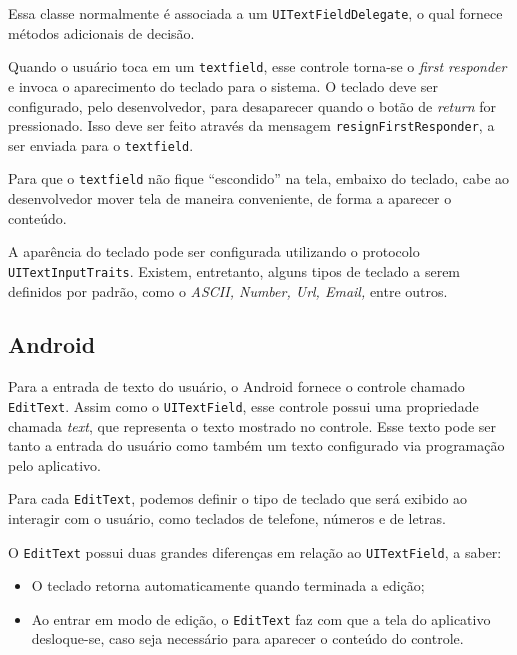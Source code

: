 	Essa classe normalmente é associada a um \texttt{UITextFieldDelegate}, o qual fornece métodos adicionais de decisão.
    
	Quando o usuário toca em um \texttt{textfield}, esse controle torna-se o \emph{first responder} e invoca o aparecimento do teclado para o sistema. O teclado deve ser configurado, pelo desenvolvedor, para desaparecer quando o botão de \emph{return} for pressionado. Isso deve ser feito através da mensagem \texttt{resignFirstResponder}, a ser enviada para o \texttt{textfield}.
    
	Para que o \texttt{textfield} não fique ``escondido'' na tela, embaixo do teclado, cabe ao desenvolvedor mover tela de maneira conveniente, de forma a aparecer o conteúdo.
   
    A aparência do teclado pode ser configurada utilizando o protocolo \texttt{UITextInputTraits}. Existem, entretanto, alguns tipos de teclado a serem definidos por padrão, como o \emph{ASCII, Number, Url, Email,} entre outros.
     
    \subsection{Android}
     
    Para a entrada de texto do usuário, o Android fornece o controle chamado \texttt{EditText}. Assim como o \texttt{UITextField}, esse controle possui uma propriedade chamada \emph{text}, que representa o texto mostrado no controle. Esse texto pode ser tanto a entrada do usuário como também um texto configurado via programação pelo aplicativo.
    
    
    
	Para cada \texttt{EditText}, podemos definir o tipo de teclado que será exibido ao interagir com o usuário, como teclados de telefone, números e de letras.
    
	O \texttt{EditText} possui duas grandes diferenças em relação ao \texttt{UITextField}, a saber:
\begin{itemize}
	\item O teclado retorna automaticamente quando terminada a edição;
	\item Ao entrar em modo de edição, o \texttt{EditText} faz com que a tela do aplicativo desloque-se, caso seja necessário para aparecer o conteúdo do controle.
\end{itemize}     
     
